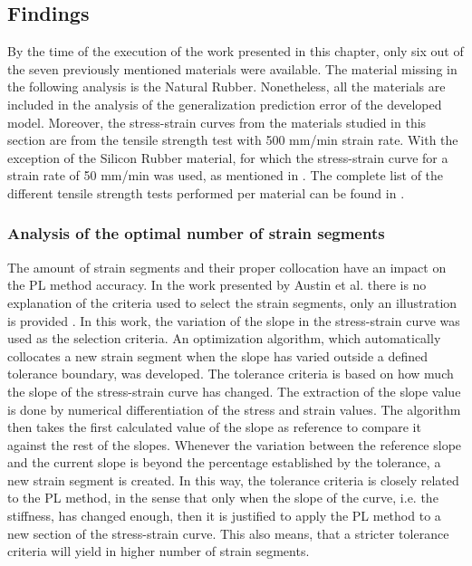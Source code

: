 \subsection{Findings}

By the time of the execution of the work presented in this chapter, only six out of the seven previously mentioned materials were available. The material missing in the following analysis is the Natural Rubber. Nonetheless, all the materials are included in the analysis of the generalization prediction error of the developed model. Moreover, the stress-strain curves from the materials studied in this section are from the tensile strength test with 500 mm/min strain rate. With the exception of the Silicon Rubber material, for which the stress-strain curve for a strain rate of 50 mm/min was used, as mentioned in . The complete list of the different tensile strength tests performed per material can be found in .

\subsubsection{Analysis of the optimal number of strain segments}

The amount of strain segments and their proper collocation have an impact on the PL method accuracy. In the work presented by Austin et al. there is no explanation of the criteria used to select the strain segments, only an illustration is provided \cite{austin2015control}. In this work, the variation of the slope in the stress-strain curve was used as the selection criteria. An optimization algorithm, which automatically collocates a new strain segment when the slope has varied outside a defined tolerance boundary, was developed. The tolerance criteria is based on how much the slope of the stress-strain curve has changed. The extraction of the slope value is done by numerical differentiation of the stress and strain values. The algorithm then takes the first calculated value of the slope as reference to compare it against the rest of the slopes. Whenever the variation between the reference slope and the current slope is beyond the percentage established by the tolerance, a new strain segment is created. In this way, the tolerance criteria is closely related to the PL method, in the sense that only when the slope of the curve, i.e. the stiffness, has changed enough, then it is justified to apply the PL method to a new section of the stress-strain curve. This also means, that a stricter tolerance criteria will yield in higher number of strain segments.

